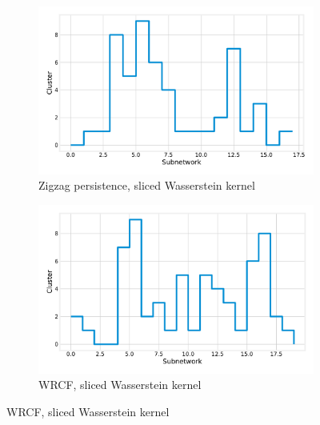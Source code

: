 \documentclass[a4paper,11pt,openany,extrafontsizes]{memoir}
\begin{document}
\begin{figure}[ht]
  \centering
  \begin{subfigure}[b]{0.46\linewidth}
    \centering
    \includegraphics[width=\linewidth]{fig/gen_zz_k.pdf}
    \caption{Zigzag persistence, sliced Wasserstein kernel}%
    \label{fig:gen_zz_k}
  \end{subfigure}\qquad
  \begin{subfigure}[b]{0.46\linewidth}
    \centering
    \includegraphics[width=\linewidth]{fig/gen_wrcf_k.pdf}
    \caption{WRCF, sliced Wasserstein kernel}%
    \label{fig:gen_wrcf_k}
  \end{subfigure}


\end{figure}
\end{document}
